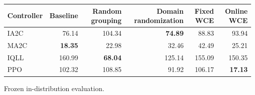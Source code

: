 \begin{tabular}{lrrrrr}
\hline
Controller & Baseline & Random grouping & Domain randomization & Fixed WCE & Online WCE \\
\hline
IA2C & 76.14 & 104.34 & \textbf{74.89} & 88.83 & 93.94 \\
MA2C & \textbf{18.35} & 22.98 & 32.46 & 42.49 & 25.21 \\
IQLL & 160.99 & \textbf{68.04} & 125.14 & 155.09 & 150.35 \\
PPO & 102.32 & 108.85 & 91.92 & 106.17 & \textbf{17.13} \\
\hline
\end{tabular}
Frozen in-distribution evaluation.
